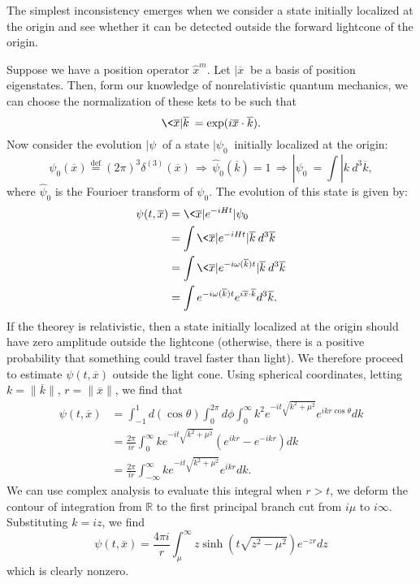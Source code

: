 The simplest inconsistency emerges when we consider a state
initially localized at the origin and see whether it can be
detected outside the forward lightcone of the origin.

Suppose we have a position operator $\widehat{x}^{m}$. Let
$|\overline{x}\>$ be a basis of position eigenstates. Then, form
our knowledge of nonrelativistic quantum mechanics, we can choose
the normalization of these kets to be such that
\begin{equation}%
\<\overline{x}|\overline{k}\> = \exp(i\overline{x}\cdot\overline{k}).
\end{equation}
Now consider the evolution $|\psi\>$ of a state $|\psi_{0}\>$
initially localized at the origin:
\begin{equation}%
\psi_{0}(\overline{x})\stackrel{\text{def}}{=}(2\pi)^{3}\delta^{(3)}(\overline{x})\,\Rightarrow\,\widehat{\psi}_{0}(\overline{k})=1\,\Rightarrow\,|\psi_{0}\>=\int|k\>d^{3}\overline{k},
\end{equation}
where $\widehat{\psi}_{0}$ is the Fourioer transform of
$\psi_{0}$. The evolution of this state is given by:
\begin{subequations}
\begin{align}
\psi(t,\overline{x}) &= \<\overline{x}|e^{-iHt}|\psi_{0}\>\\
&= \int \<\overline{x}|e^{-iHt}|\overline{k}\>d^{3}\overline{k}\\
&= \int
\<\overline{x}|e^{-i\omega(\overline{k})t}|\overline{k}\>d^{3}\overline{k}\\
&= \int e^{-i\omega(\overline{k})t}e^{i\overline{x}\cdot\overline{k}}d^{3}\overline{k}.
\end{align}
\end{subequations}
If the theorey is relativistic, then a state initially localized
at the origin should have zero amplitude outside the lightcone
(otherwise, there is a positive probability that something could
travel faster than light). We therefore proceed to estimate
$\psi(t,\overline{x})$ outside the light cone. Using spherical
coordinates, letting $k=\|\overline{k}\|$, $r=\|\overline{x}\|$,
we find that
\begin{subequations}
\begin{align}
\psi(t,\overline{x}) &=
\int^{1}_{-1}d(\cos\theta)\int^{2\pi}_{0}d\phi\int^{\infty}_{0}k^{2}e^{-it\sqrt{k^{2}+\mu^{2}}}e^{ikr\cos\theta}dk\\
&=\frac{2\pi}{ir}\int^{\infty}_{0}ke^{-it\sqrt{k^{2}+\mu^{2}}}(e^{ikr}-e^{-ikr})dk\\
&=\frac{2\pi}{ir}\int^{\infty}_{-\infty}ke^{-it\sqrt{k^{2}+\mu^{2}}}e^{ikr}dk.
\end{align}
\end{subequations}
We can use complex analysis to evaluate this integral when $r>t$,
we deform the contour of integration from $\mathbb{R}$ to the
first principal branch cut from $i\mu$ to $i\infty$. Substituting
$k=iz$, we find
\begin{equation}%
\psi(t,\overline{x}) = \frac{4\pi i}{r}\int^{\infty}_{\mu}z\sinh(t\sqrt{z^{2}-\mu^{2}})e^{-zr}dz
\end{equation}
which is clearly nonzero.

